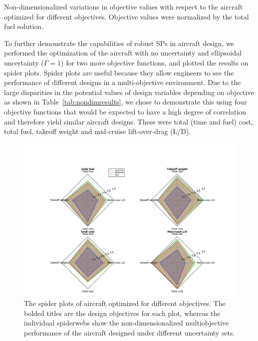 \begin{table}
\caption{Non-dimensionalized variations in objective values with respect to the aircraft optimized
for different objectives. Objective values were normalized by the total fuel solution.}
    \label{tab:nondimresults}
\end{table}

To further demonstrate the capabilities of robust SPs in aircraft design,
we performed the optimization of the aircraft with no uncertainty and ellipsoidal uncertainty ($\Gamma = 1$)
for two more objective functions, and plotted the results on spider plots.
Spider plots are useful because they allow engineers to see the performance of different designs in a multi-objective
environment. Due to the large disparities in the potential values of design variables depending
on objective as shown in Table~\ref{tab:nondimresults}, we chose to demonstrate this using four objective functions
that would be expected to have a high degree of correlation and therefore yield similar aircraft designs. These were
 total (time and fuel) cost, total fuel, takeoff weight and mid-cruise lift-over-drag (L/D).

\begin{figure}
    \includegraphics[width = 0.95\linewidth]{figures/4objradar.png}
    \caption{The spider plots of aircraft optimized for different objectives.
    The bolded titles are the design objectives for each plot, whereas the individual spiderwebs
    show the non-dimensionalized multiobjective performance of the aircraft designed under different
    uncertainty sets.}
    \label{fig:spider}
\end{figure}


